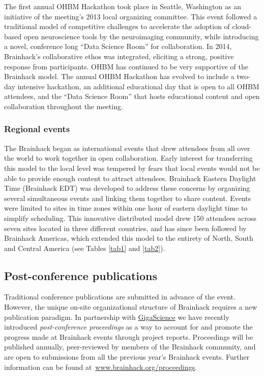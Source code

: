 \documentclass[11pt]{bmc_article_s50}
\begin{document}
The first annual OHBM Hackathon took place in Seattle, Washington as an initiative of the meeting's 2013 local organizing committee. This event followed a traditional model of competitive challenges to accelerate the adoption of cloud-based open neuroscience tools by the neuroimaging community, while introducing a novel, conference long ``Data Science Room'' for collaboration. In 2014, Brainhack's collaborative ethos was integrated, eliciting a strong, positive response from participants. OHBM has continued to be very supportive of the Brainhack model. The annual OHBM Hackathon has evolved to include a two-day intensive hackathon, an additional educational day that is open to all OHBM attendees, and the ``Data Science Room'' that hosts educational content and open collaboration throughout the meeting. 

\subsubsection{Regional events}

The Brainhack began as international events that drew attendees from all over the world to work together in open collaboration. Early interest for transferring this model to the local level was tempered by fears that local events would not be able to provide enough content to attract attendees. Brainhack Eastern Daylight Time (Brainhack EDT) was developed to address these concerns by organizing several simultaneous events and linking them together to share content. Events were limited to sites in time zones within one hour of eastern daylight time to simplify scheduling. This innovative distributed model drew 150 attendees across seven sites located in three different countries, and has since been followed by Brainhack Americas, which extended this model to the entirety of North, South and Central America (see Tables \ref{tab1} and \ref{tab2}).

\subsection{Post-conference publications}

Traditional conference publications are submitted in advance of the event. However, the unique on-site organizational structure of Brainhack requires a new publication paradigm. In partnership with \href{http://www.gigasciencejournal.com/}{GigaScience} we have recently introduced  \emph{post-conference proceedings} as a way to account for and promote the progress made at Brainhack events through project reports. Proceedings will be published annually, peer-reviewed by members of the Brainhack community, and are open to submissions from all the previous year's Brainhack events. Further information can be found at~\href{http://brainhack.org/proceedings}{www.brainhack.org/proceedings}. 
\end{document}
